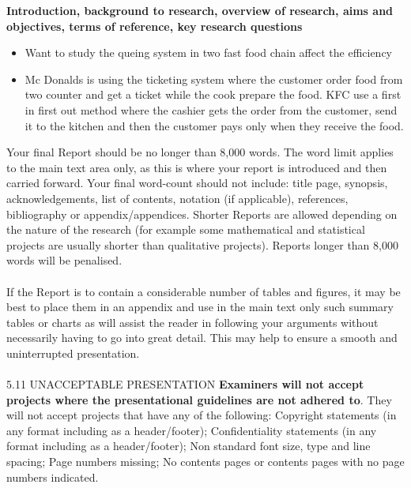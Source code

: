 \textbf{Introduction, background to research, overview of research, aims and objectives, terms of reference, key research questions}

\begin{itemize}
	\item Want to study the queing system in two fast food chain affect the efficiency
	\item Mc Donalds is using the ticketing system where the customer order food from two counter and get a ticket while the cook prepare the food. KFC use a first in first out method where the cashier gets the order from the customer, send it to the kitchen and then the customer pays only when they receive the food.




\end{itemize}

Your final Report should be no longer than 8,000 words. The word limit applies to the main text area only, as this is where your report is introduced and then carried forward. Your final word-count should not include: title page, synopsis, acknowledgements, list of contents, notation (if applicable), references, bibliography or appendix/appendices. Shorter Reports are allowed depending on the nature of the research (for example some mathematical and statistical projects are usually shorter than qualitative projects). Reports longer than 8,000 words will be penalised.\\
\\
If the Report is to contain a considerable number of tables and figures, it may be best to place them in an appendix and use in the main text only such summary tables or charts as will assist the reader in following your arguments without necessarily having to go into great detail. This may help to ensure a smooth and uninterrupted presentation.\\
\\
5.11 UNACCEPTABLE PRESENTATION
\textbf{Examiners will not accept projects where the presentational guidelines are not adhered to}. They will not accept projects that have any of the following:
Copyright statements (in any format including as a header/footer);
Confidentiality statements (in any format including as a header/footer);
Non standard font size, type and line spacing;
Page numbers missing;
No contents pages or contents pages with no page numbers indicated.
